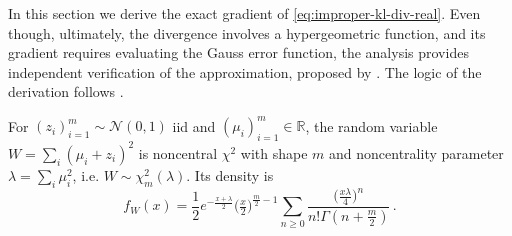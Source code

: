 \documentclass[a4paper,10pt,twocolumn]{article}
\begin{document}
In this section we derive the exact gradient of \eqref{eq:improper-kl-div-real}. Even
though, ultimately, the divergence involves a hypergeometric function, and its gradient
requires evaluating the Gauss error function, the analysis provides independent verification
of the approximation, proposed by \citet{molchanov_variational_2017}. The logic of the
derivation follows \citet{lapidoth_capacity_2003}.

For $(z_i)_{i=1}^m \sim \mathcal{N}(0, 1)$ iid and $
  (\mu_i)_{i=1}^m \in \mathbb{R}
$, the random variable $W = \sum_i (\mu_i + z_i)^2$ is noncentral $\chi^2$ with shape $m$
and noncentrality parameter $\lambda = \sum_i \mu_i^2$, i.e. $W\sim \chi^2_m(\lambda)$.
Its density is
\begin{equation}  \label{eq:nonchisq-density}
  f_W(x)
    = \frac12 e^{- \tfrac{x + \lambda}2} \bigl(\tfrac{x}2\bigr)^{\tfrac{m}2 - 1}
      \sum_{n \geq 0} \frac{
        \bigl(\tfrac{x \lambda}4\bigr)^n
      }{
        n! \Gamma(n + \tfrac{m}2)
      }
    \,.
\end{equation}
\end{document}
